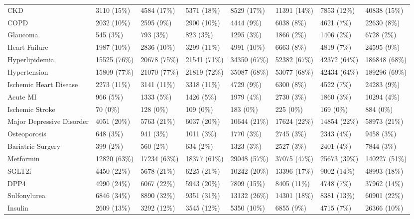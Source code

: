 \begin{longtable}{p{}p{}p{}p{}p{}p{}p{}p{}}
  CKD & 3110 (15\%) & 4584 (17\%) & 5371 (18\%) & 8529 (17\%) & 11391 (14\%) & 7853 (12\%) & 40838 (15\%) \\ 
  COPD & 2032 (10\%) & 2595 (9\%) & 2900 (10\%) & 4444 (9\%) & 6038 (8\%) & 4621 (7\%) & 22630 (8\%) \\ 
  Glaucoma & 545 (3\%) & 793 (3\%) & 823 (3\%) & 1295 (3\%) & 1866 (2\%) & 1406 (2\%) & 6728 (2\%) \\ 
  Heart Failure & 1987 (10\%) & 2836 (10\%) & 3299 (11\%) & 4991 (10\%) & 6663 (8\%) & 4819 (7\%) & 24595 (9\%) \\ 
  Hyperlipidemia & 15525 (76\%) & 20678 (75\%) & 21541 (71\%) & 34350 (67\%) & 52382 (67\%) & 42372 (64\%) & 186848 (68\%) \\ 
  Hypertension & 15809 (77\%) & 21070 (77\%) & 21819 (72\%) & 35087 (68\%) & 53077 (68\%) & 42434 (64\%) & 189296 (69\%) \\ 
  Ischemic Heart Disease & 2273 (11\%) & 3141 (11\%) & 3318 (11\%) & 4729 (9\%) & 6300 (8\%) & 4522 (7\%) & 24283 (9\%) \\ 
  Acute MI & 966 (5\%) & 1333 (5\%) & 1426 (5\%) & 1979 (4\%) & 2730 (3\%) & 1860 (3\%) & 10294 (4\%) \\ 
  Ischemic Stroke & 70 (0\%) & 128 (0\%) & 109 (0\%) & 183 (0\%) & 225 (0\%) & 169 (0\%) & 884 (0\%) \\ 
  Major Depressive Disorder & 4051 (20\%) & 5763 (21\%) & 6037 (20\%) & 10644 (21\%) & 17624 (22\%) & 14854 (22\%) & 58973 (21\%) \\ 
  Osteoporosis & 648 (3\%) & 941 (3\%) & 1011 (3\%) & 1770 (3\%) & 2745 (3\%) & 2343 (4\%) & 9458 (3\%) \\ 
  Bariatric Surgery & 399 (2\%) & 560 (2\%) & 634 (2\%) & 1323 (3\%) & 2527 (3\%) & 2401 (4\%) & 7844 (3\%) \\ 
  Metformin & 12820 (63\%) & 17234 (63\%) & 18377 (61\%) & 29048 (57\%) & 37075 (47\%) & 25673 (39\%) & 140227 (51\%) \\ 
  SGLT2i & 4450 (22\%) & 5678 (21\%) & 6225 (21\%) & 10242 (20\%) & 13396 (17\%) & 9002 (14\%) & 48993 (18\%) \\ 
  DPP4 & 4990 (24\%) & 6067 (22\%) & 5943 (20\%) & 7809 (15\%) & 8405 (11\%) & 4748 (7\%) & 37962 (14\%) \\ 
  Sulfonylurea & 6846 (34\%) & 8890 (32\%) & 9351 (31\%) & 13132 (26\%) & 14301 (18\%) & 8381 (13\%) & 60901 (22\%) \\ 
  Insulin & 2609 (13\%) & 3292 (12\%) & 3545 (12\%) & 5350 (10\%) & 6855 (9\%) & 4715 (7\%) & 26366 (10\%) \\ 

\end{longtable}
